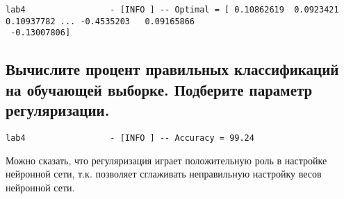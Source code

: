 \begin{lstlisting}
lab4                 - [INFO ] -- Optimal = [ 0.10862619  0.0923421   0.10937782 ... -0.4535203   0.09165866
 -0.13007806]
\end{lstlisting}

\subsection{Вычислите процент правильных классификаций на обучающей выборке. Подберите параметр регуляризации.}

\begin{lstlisting}
lab4                 - [INFO ] -- Accuracy = 99.24
\end{lstlisting}

Можно сказать, что регуляризация играет положительную роль в настройке нейронной сети, т.к. позволяет сглаживать неправильную настройку весов нейронной сети.




